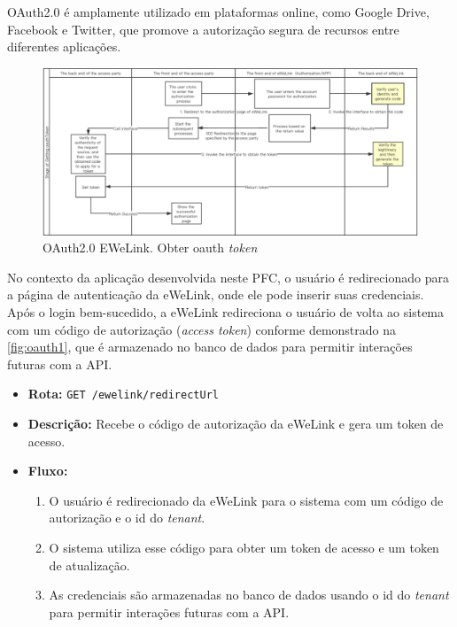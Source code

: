 OAuth2.0 é amplamente utilizado em plataformas online, como Google Drive, Facebook e Twitter, que promove a autorização segura de recursos entre diferentes aplicações.

\begin{figure}[htp]
	\caption{\label{fig:oauth1}OAuth2.0 EWeLink. Obter oauth \textit{token}}
	\begin{center}
	  \includegraphics[scale=0.45]{images/cap5/oauth_1.png}
	\end{center}
\end{figure}

No contexto da aplicação desenvolvida neste PFC, o usuário é redirecionado para a página de autenticação da eWeLink, onde ele pode inserir suas credenciais. Após o login bem-sucedido, a eWeLink redireciona o usuário de volta ao sistema com um código de autorização (\textit{access token}) conforme demonstrado na \autoref{fig:oauth1}, que é armazenado no banco de dados para permitir interações futuras com a API.

\begin{itemize}
    \item \textbf{Rota:} \texttt{GET /ewelink/redirectUrl}
    \item \textbf{Descrição:} Recebe o código de autorização da eWeLink e gera um token de acesso.
    \item \textbf{Fluxo:}
    \begin{enumerate}
        \item O usuário é redirecionado da eWeLink para o sistema com um código de autorização e o id do \textit{tenant}.
        \item O sistema utiliza esse código para obter um token de acesso e um token de atualização.
        \item As credenciais são armazenadas no banco de dados usando o id do \textit{tenant} para permitir interações futuras com a API.
    \end{enumerate}
\end{itemize}

